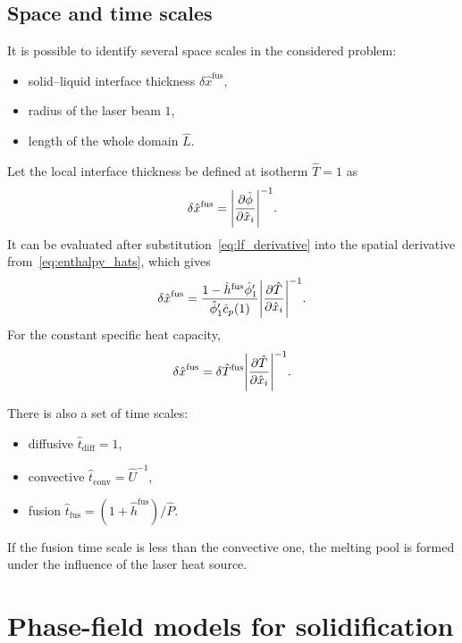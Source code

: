 \documentclass{article}
\newcommand{\fusion}[1]{{#1}^\mathrm{fus}}
\newcommand{\Hx}{\hat{x}}
\newcommand{\Ht}{\hat{t}}
\newcommand{\Hh}{\hat{h}}
\newcommand{\HT}{\hat{T}}
\newcommand{\HP}{\hat{P}}
\newcommand{\Hc}{\hat{c}}
\newcommand{\Hphi}{\hat{\phi}}
\newcommand{\HU}{\hat{U}}
\newcommand{\HL}{\hat{L}}
\begin{document}
\subsection{Space and time scales}

It is possible to identify several space scales in the considered problem:
\begin{itemize}
    \item solid--liquid interface thickness \(\delta\fusion{\Hx}\),
    \item radius of the laser beam \(1\),
    \item length of the whole domain \(\HL\).
\end{itemize}

Let the local interface thickness be defined at isotherm \(\HT=1\) as
\begin{equation}\label{eq:thickness_def}
    \delta\fusion{\Hx} = \qty|\pdv{\Hphi}{\Hx_i}|^{-1}.
\end{equation}
It can be evaluated after substitution~\eqref{eq:lf_derivative} into the spatial derivative from~\eqref{eq:enthalpy_hats}, which gives
\begin{equation}\label{eq:thickness_general}
    \fusion{\delta\Hx} = \frac{1-\fusion{\Hh}\Hphi'_1}{\Hphi'_1\Hc_p(1)}\qty|\pdv{\HT}{\Hx_i}|^{-1}.
\end{equation}
For the constant specific heat capacity,
\begin{equation}\label{eq:thickness_const}
    \fusion{\delta\Hx} = \delta\fusion{\HT}\qty|\pdv{\HT}{\Hx_i}|^{-1}.
\end{equation}

There is also a set of time scales:
\begin{itemize}
    \item diffusive \(\Ht_\mathrm{diff} = 1\),
    \item convective \(\Ht_\mathrm{conv} = \HU^{-1}\),
    \item fusion \(\Ht_\mathrm{fus} = (1+\fusion{\Hh})/\HP\).
\end{itemize}
If the fusion time scale is less than the convective one, the melting pool is formed under the influence of the laser heat source.

\section{Phase-field models for solidification}\label{sec:phase-field}
\end{document}
